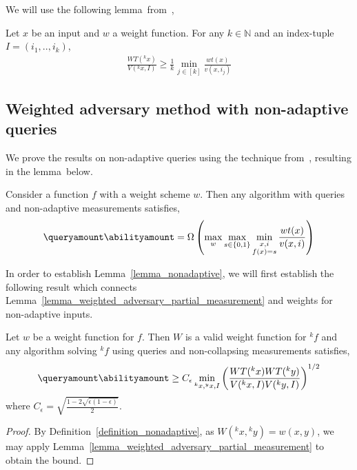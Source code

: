 We will use the following lemma~from~\cite{nonadaptive_weighted_adversary},

\begin{lemma}\label{lemma_nonadaptive_average_weights}
    Let $x$ be an input and $w$ a weight function. For any $k\in \mathbb{N}$ and an index-tuple $I=(i_1,..,i_k)$,
    \begin{align*}
        \frac{WT({}^kx)}{V({}^kx, I)} \geq \frac{1}{k} \min_{j\in [k]}\frac{wt(x)}{v(x,i_j)}
    \end{align*}
\end{lemma}


\subsection{Weighted adversary method with non-adaptive queries}

We prove the results on non-adaptive queries using the technique from~\cite{nonadaptive_weighted_adversary}, resulting in the lemma~below.

\begin{lemma}\label{lemma_nonadaptive}
    Consider a function $f$ with a weight scheme $w$. Then any \pdqpnaqname algorithm with \queryamount queries and \abilityamount non-adaptive measurements satisfies,
     \begin{align*}
        \queryamount\abilityamount = \Omega \left( \max_w \max_{s\in \{0,1\}} \min_{\substack{x,i \\ f(x)=s}} \frac{wt(x)}{v(x,i)} \right)
    \end{align*}
\end{lemma}

In order to establish Lemma~\ref{lemma_nonadaptive}, we will first establish the following result which connects Lemma~\ref{lemma_weighted_adversary_partial_measurement} and weights for non-adaptive inputs.

\begin{lemma}\label{lemma_nonadaptive_weights}
    Let $w$ be a weight function for $f$. Then $W$ is a valid weight function for ${}^kf$ and any algorithm solving ${}^kf$ using \queryamount queries and \abilityamount non-collapsing measurements satisfies,
    \begin{align*}
        \queryamount\abilityamount \geq C_{\epsilon} \min_{{}^kx, {}^yx, I} \left(\frac{WT({}^kx) WT({}^ky)}{V({}^kx, I)V({}^ky,I)}\right)^{1/2}
    \end{align*}
    where $C_{\epsilon} = \sqrt{\frac{1-2\sqrt{\epsilon (1-\epsilon)}}{2}}$.
\end{lemma}
\begin{proof}
    By Definition~\ref{definition_nonadaptive}, as $W({}^kx, {}^ky)=w(x,y)$, we may apply Lemma~\ref{lemma_weighted_adversary_partial_measurement} to obtain the bound.
\end{proof}

